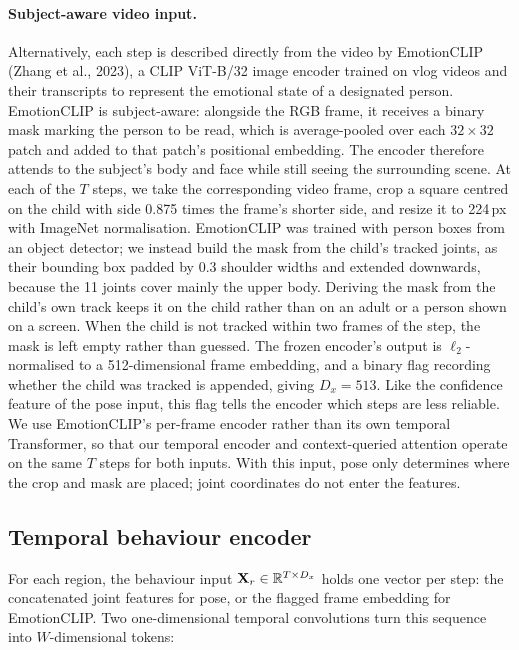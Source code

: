 \paragraph{Subject-aware video input.} Alternatively, each step is described directly from the video by EmotionCLIP (Zhang et al., 2023), a CLIP ViT-B/32 image encoder trained on vlog videos and their transcripts to represent the emotional state of a designated person. EmotionCLIP is subject-aware: alongside the RGB frame, it receives a binary mask marking the person to be read, which is average-pooled over each $32\times32$ patch and added to that patch's positional embedding. The encoder therefore attends to the subject's body and face while still seeing the surrounding scene. At each of the $T$ steps, we take the corresponding video frame, crop a square centred on the child with side 0.875 times the frame's shorter side, and resize it to 224\,px with ImageNet normalisation. EmotionCLIP was trained with person boxes from an object detector; we instead build the mask from the child's tracked joints, as their bounding box padded by 0.3 shoulder widths and extended downwards, because the 11 joints cover mainly the upper body. Deriving the mask from the child's own track keeps it on the child rather than on an adult or a person shown on a screen. When the child is not tracked within two frames of the step, the mask is left empty rather than guessed. The frozen encoder's output is $\ell_2$-normalised to a 512-dimensional frame embedding, and a binary flag recording whether the child was tracked is appended, giving $D_x=513$. Like the confidence feature of the pose input, this flag tells the encoder which steps are less reliable. We use EmotionCLIP's per-frame encoder rather than its own temporal Transformer, so that our temporal encoder and context-queried attention operate on the same $T$ steps for both inputs. With this input, pose only determines where the crop and mask are placed; joint coordinates do not enter the features.

\subsection{Temporal behaviour encoder}
\label{sec:pose-encoder}

For each region, the behaviour input $\mathbf{X}_r\in\mathbb{R}^{T\times D_x}$ holds one vector per step: the concatenated joint features for pose, or the flagged frame embedding for EmotionCLIP. Two one-dimensional temporal convolutions turn this sequence into $W$-dimensional tokens:

